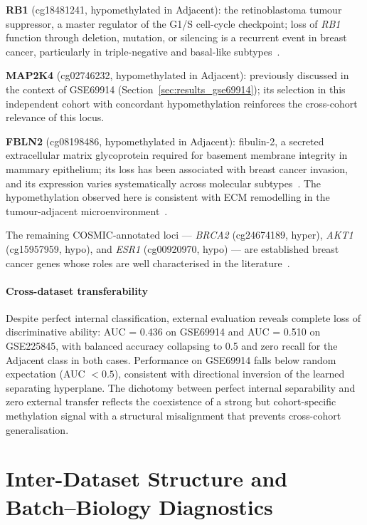 \textbf{RB1} (cg18481241, hypomethylated in Adjacent): the retinoblastoma
tumour suppressor, a master regulator of the G1/S cell-cycle checkpoint;
loss of \textit{RB1} function through deletion, mutation, or silencing is
a recurrent event in breast cancer, particularly in triple-negative and
basal-like subtypes~\cite{cancer2012comprehensive}.

\textbf{MAP2K4} (cg02746232, hypomethylated in Adjacent): previously
discussed in the context of GSE69914 (Section~\ref{sec:results_gse69914});
its selection in this independent cohort with concordant hypomethylation
reinforces the cross-cohort relevance of this locus.

\textbf{FBLN2} (cg08198486, hypomethylated in Adjacent): fibulin-2, 
a secreted extracellular matrix glycoprotein required for basement 
membrane integrity in mammary epithelium; its loss has been associated 
with breast cancer invasion, and its expression varies systematically 
across molecular subtypes~\cite{ibrahim2024fbln2}. The hypomethylation 
observed here is consistent with ECM remodelling in the tumour-adjacent 
microenvironment~\cite{naba2014mammary}.

The remaining COSMIC-annotated loci --- \textit{BRCA2} (cg24674189, hyper), \textit{AKT1} (cg15957959, hypo), and
\textit{ESR1} (cg00920970, hypo) --- are established breast cancer genes
whose roles are well characterised in the
literature~\cite{cancer2012comprehensive}. 

\paragraph{Cross-dataset transferability}

Despite perfect internal classification, external evaluation reveals
complete loss of discriminative ability: AUC = 0.436 on GSE69914 and
AUC = 0.510 on GSE225845, with balanced accuracy collapsing to 0.5 and
zero recall for the Adjacent class in both cases. Performance on GSE69914
falls below random expectation (AUC $< 0.5$), consistent with directional
inversion of the learned separating hyperplane. The dichotomy between
perfect internal separability and zero external transfer reflects the
coexistence of a strong but cohort-specific methylation signal with a
structural misalignment that prevents cross-cohort generalisation.

\section{Inter-Dataset Structure and Batch--Biology
         Diagnostics}
\label{sec:inter_dataset}

